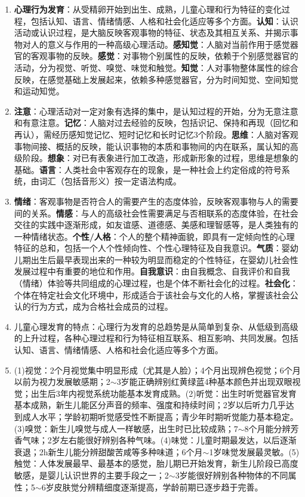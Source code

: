 \begin{enumerate}[leftmargin=*, itemsep=5pt]
    \item \textbf{心理行为发育}：从受精卵开始到出生、成熟，儿童心理和行为特征的变化过程，包括认知、语言、情绪情感、人格和社会化适应等多个方面。\textbf{认知}：认识活动或认识过程，是大脑反映客观事物的特征、状态及其相互关系、并揭示事物对人的意义与作用的一种高级心理活动。\textbf{感知觉}：人脑对当前作用于感觉器官的客观事物的反映。\textbf{感觉}：对事物个别属性的反映，依赖于个别感觉器官的活动，分为视觉、听觉、嗅觉、味觉和触觉。\textbf{知觉}：人对事物整体属性的综合反映，在感觉基础上发展起来，依赖多种感觉器官，分为时间知觉、空间知觉和运动知觉。

    \item \textbf{注意}：心理活动对一定对象有选择的集中，是认知过程的开始，分为无意注意和有意注意。\textbf{记忆}：人脑对过去经验的反映，包括识记、保持和再现（回忆和再认），需经历感知觉记忆、短时记忆和长时记忆3个阶段。\textbf{思维}：人脑对客观事物间接、概括的反映，能认识事物的本质和事物间的内在联系，属认知的高级阶段。\textbf{想象}：对已有表象进行加工改造，形成新形象的过程，思维是想象的基础。\textbf{语言}：人类社会中客观存在的现象，是一种社会上约定俗成的符号系统，由词汇（包括音形义）按一定语法构成。

    \item \textbf{情绪}：客观事物是否符合人的需要产生的态度体验，反映客观事物与人的需要间的关系。\textbf{情感}：与人的高级社会性需要满足与否相联系的态度体验，在社会交往的实践中逐渐形成，如友谊感、道德感、美感和理智感等，是人类独有的一种情绪状态。\textbf{个性/人格}：个人的整个精神面貌，即具有一定倾向性的心理特征的总和，包括一个人个性倾向性、个性心理特征及自我意识。\textbf{气质}：婴幼儿期出生后最早表现出来的一种较为明显而稳定的个性特征，在婴幼儿社会性发展过程中有重要的地位和作用。\textbf{自我意识}：由自我概念、自我评价和自我（情绪）体验等共同组成的心理过程，也是个体不断社会化的过程。\textbf{社会化}：个体在特定社会文化环境中，形成适合于该社会与文化的人格，掌握该社会公认的行为方式，成为合格社会成员的过程。

    \item 儿童心理发育的特点：心理行为发育的总趋势是从简单到复杂、从低级到高级的上升过程，各种心理过程和行为特征相互联系、相互影响、共同发展。包括认知、语言、情绪情感、人格和社会化适应等多个方面。

    \item (1)视觉：2个月视觉集中明显形成（尤其是人脸）；4个月出现辨色视觉；6个月以前为视力发展敏感期；2$\sim$3岁能正确辨别红黄绿蓝4种基本颜色并出现双眼视觉；出生后3年内视觉系统功能基本发育成熟。(2)听觉：出生时听觉器官发育基本成熟，新生儿能区分声音的频率、强度和持续时间；2岁以后听力几乎达到成人水平；学龄初期听觉感受性不断提高；青少年时期听觉能力基本稳定。(3)嗅觉：新生儿嗅觉与成人一样敏感，出生时已比较成熟；7$\sim$8个月能分辨芳香气味；2岁左右能很好辨别各种气味。(4)味觉：儿童时期最发达，以后逐渐衰退；2h新生儿能分辨甜酸苦咸等多种味道；6个月$\sim$1岁味觉发展最灵敏。(5)触觉：人体发展最早、最基本的感觉，胎儿期已开始发育，新生儿阶段已高度敏感，是婴儿认识世界的主要手段之一；2$\sim$3岁能很好辨别各种物体的不同属性；5$\sim$6岁皮肤觉分辨精细度逐渐提高，学龄前期已逐步趋于完善。


\end{enumerate}
